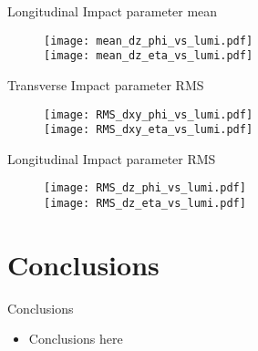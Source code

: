 \documentclass{beamer}
\begin{document}
\begin{frame}{Longitudinal Impact parameter mean}
  \begin{figure}
    \centering
    \texttt{[image: mean\_dz\_phi\_vs\_lumi.pdf]}\\
    \texttt{[image: mean\_dz\_eta\_vs\_lumi.pdf]}
  \end{figure}
\end{frame}

\begin{frame}{Transverse Impact parameter RMS}
  \begin{figure}
    \centering
    \texttt{[image: RMS\_dxy\_phi\_vs\_lumi.pdf]}\\
    \texttt{[image: RMS\_dxy\_eta\_vs\_lumi.pdf]}
  \end{figure}
\end{frame}

\begin{frame}{Longitudinal Impact parameter RMS}
  \begin{figure}
    \centering
    \texttt{[image: RMS\_dz\_phi\_vs\_lumi.pdf]}\\
    \texttt{[image: RMS\_dz\_eta\_vs\_lumi.pdf]}
  \end{figure}
\end{frame}


\section{Conclusions}
\begin{frame}{Conclusions}
{
\begin{itemize}
\item Conclusions here
\end{itemize}
}
\end{frame} 
\end{document}
